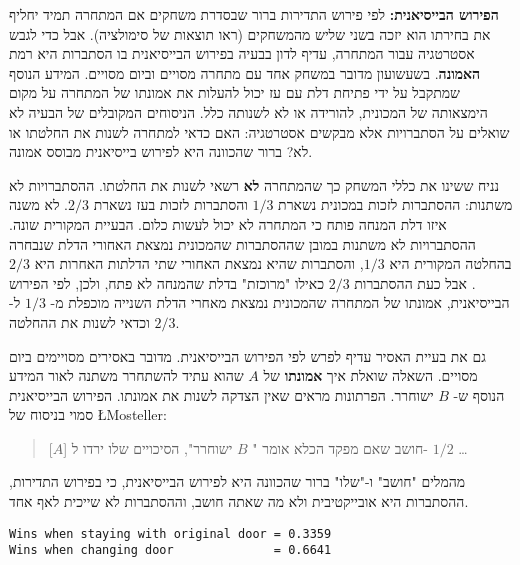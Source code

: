 \textbf{הפירוש הבייסיאנית:}
לפי פירוש התדירות ברור שבסדרת משחקים אם המתחרה תמיד יחליף את בחירתו הוא יזכה בשני שליש מהמשחקים (ראו תוצאות של סימולציה). אבל כדי לגבש אסטרטגיה עבור המתחרה, עדיף לדון בבעיה בפירוש הבייסיאנית בו הסתברות היא רמת 
\textbf{האמונה}.
בשעשועון מדובר במשחק אחד עם מתחרה מסויים וביום מסויים. המידע הנוסף שמתקבל על ידי פתיחת דלת עם עז יכול להעלות את אמונתו של המתחרה על מקום הימצאותה של המכונית, להורידה או לא לשנותה כלל. הניסוחים המקובלים של הבעיה לא שואלים על הסתברויות אלא מבקשים אסטרטגיה: האם כדאי למתחרה לשנות את החלטתו או לא? ברור שהכוונה היא לפירוש בייסיאנית מבוסס אמונה. 

נניח ששינו את כללי המשחק כך שהמתחרה
\textbf{לא}
רשאי לשנות את החלטתו. ההסתברויות לא משתנות: ההסתברות לזכות במכונית נשארת
$1/3$
והסתברות לזכות בעז נשארת
$2/3$.
לא משנה איזו דלת המנחה פותח כי המתחרה לא יכול לעשות כלום. הבעיית המקורית שונה. ההסתברויות לא משתנות במובן שההסתברות שהמכונית נמצאת האחורי הדלת שנבחרה בהחלטה המקורית היא
$1/3$,
והסתברות שהיא נמצאת האחורי שתי הדלתות האחרות היא
$2/3$.
אבל כעת ההסתברות
$2/3$
כאילו "מרוכזת" בדלת שהמנחה לא פתח, ולכן, לפי הפירוש הבייסיאנית, אמונתו של המתחרה שהמכונית נמצאת מאחרי הדלת השנייה מוכפלת מ-%
$1/3$
ל-%
$2/3$
וכדאי לשנות את ההחלטה.

גם את בעיית האסיר עדיף לפרש לפי הפירוש הבייסיאנית. מדובר באסירים מסויימים ביום מסויים. השאלה שואלת איך 
\textbf{אמונתו}
של 
$A$
שהוא עתיד להשתחרר משתנה לאור המידע הנוסף ש-%
$B$
ישוחרר. הפרתונות מראים שאין הצדקה לשנות את אמונתו. הפירוש הבייסיאנית סמוי בניסוח של
\L{Mosteller}:
\begin{quote}
[$A$]
חושב שאם מפקד הכלא אומר "%
$B$
ישוחרר", הסיכויים שלו ירדו ל-%
$1/2$ \ldots{}
\end{quote}
מהמלים "חושב" ו-"שלו" ברור שהכוונה היא לפירוש הבייסיאנית, כי בפירוש התדירות, ההסתברות היא אובייקטיבית ולא מה שאתה חושב, וההסתברות לא שייכית לאף אחד.

\medskip

\sml{}

\begin{verbatim}
Wins when staying with original door = 0.3359
Wins when changing door              = 0.6641
\end{verbatim}


